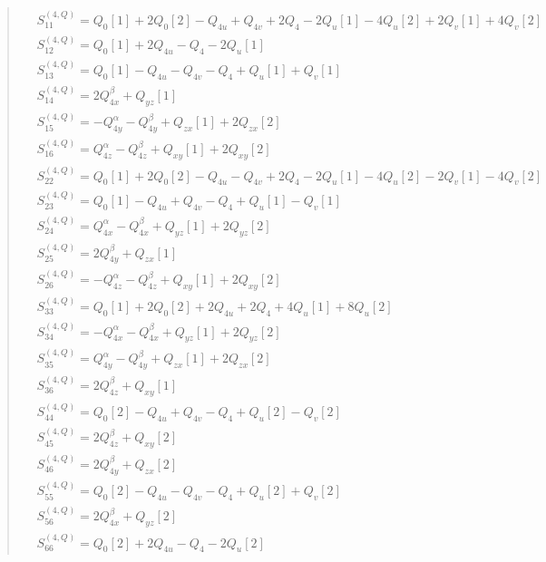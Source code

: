 \documentclass[fleqn,10pt]{jsarticle}
\begin{document}
\begin{quote}
\begin{align*}
& S^{(4,Q)}_{11} = Q_{0}[1] + 2 Q_{0}[2] - Q_{4u} + Q_{4v} + 2 Q_{4} - 2 Q_{u}[1] - 4 Q_{u}[2] + 2 Q_{v}[1] + 4 Q_{v}[2] \\
& S^{(4,Q)}_{12} = Q_{0}[1] + 2 Q_{4u} - Q_{4} - 2 Q_{u}[1] \\
& S^{(4,Q)}_{13} = Q_{0}[1] - Q_{4u} - Q_{4v} - Q_{4} + Q_{u}[1] + Q_{v}[1] \\
& S^{(4,Q)}_{14} = 2 Q_{4x}^{\beta} + Q_{yz}[1] \\
& S^{(4,Q)}_{15} = - Q_{4y}^{\alpha} - Q_{4y}^{\beta} + Q_{zx}[1] + 2 Q_{zx}[2] \\
& S^{(4,Q)}_{16} = Q_{4z}^{\alpha} - Q_{4z}^{\beta} + Q_{xy}[1] + 2 Q_{xy}[2] \\
& S^{(4,Q)}_{22} = Q_{0}[1] + 2 Q_{0}[2] - Q_{4u} - Q_{4v} + 2 Q_{4} - 2 Q_{u}[1] - 4 Q_{u}[2] - 2 Q_{v}[1] - 4 Q_{v}[2] \\
& S^{(4,Q)}_{23} = Q_{0}[1] - Q_{4u} + Q_{4v} - Q_{4} + Q_{u}[1] - Q_{v}[1] \\
& S^{(4,Q)}_{24} = Q_{4x}^{\alpha} - Q_{4x}^{\beta} + Q_{yz}[1] + 2 Q_{yz}[2] \\
& S^{(4,Q)}_{25} = 2 Q_{4y}^{\beta} + Q_{zx}[1] \\
& S^{(4,Q)}_{26} = - Q_{4z}^{\alpha} - Q_{4z}^{\beta} + Q_{xy}[1] + 2 Q_{xy}[2] \\
& S^{(4,Q)}_{33} = Q_{0}[1] + 2 Q_{0}[2] + 2 Q_{4u} + 2 Q_{4} + 4 Q_{u}[1] + 8 Q_{u}[2] \\
& S^{(4,Q)}_{34} = - Q_{4x}^{\alpha} - Q_{4x}^{\beta} + Q_{yz}[1] + 2 Q_{yz}[2] \\
& S^{(4,Q)}_{35} = Q_{4y}^{\alpha} - Q_{4y}^{\beta} + Q_{zx}[1] + 2 Q_{zx}[2] \\
& S^{(4,Q)}_{36} = 2 Q_{4z}^{\beta} + Q_{xy}[1] \\
& S^{(4,Q)}_{44} = Q_{0}[2] - Q_{4u} + Q_{4v} - Q_{4} + Q_{u}[2] - Q_{v}[2] \\
& S^{(4,Q)}_{45} = 2 Q_{4z}^{\beta} + Q_{xy}[2] \\
& S^{(4,Q)}_{46} = 2 Q_{4y}^{\beta} + Q_{zx}[2] \\
& S^{(4,Q)}_{55} = Q_{0}[2] - Q_{4u} - Q_{4v} - Q_{4} + Q_{u}[2] + Q_{v}[2] \\
& S^{(4,Q)}_{56} = 2 Q_{4x}^{\beta} + Q_{yz}[2] \\
& S^{(4,Q)}_{66} = Q_{0}[2] + 2 Q_{4u} - Q_{4} - 2 Q_{u}[2]
\end{align*}
\end{quote}
\end{document}
